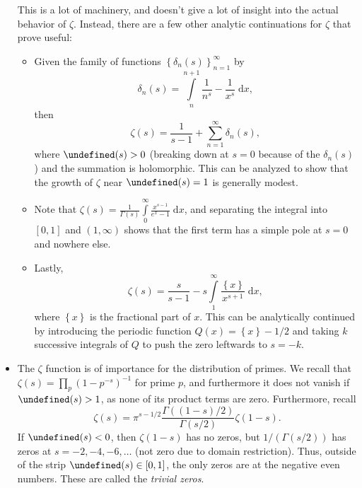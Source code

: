 \documentclass[11pt,
        usenames, %
        dvipsnames %
    ]{report}
\newcommand*{\p}[1]{\left(#1\right)}
\newcommand*{\z}[1]{\left\{#1\right\}}
\let\Re\undefined
\DeclareMathOperator{\Re}{Re}
\begin{document}
\begin{itemize}
        This is a lot of machinery, and doesn't give a lot of insight into the
        actual behavior of $\zeta$. Instead, there are a few other analytic
        continuations for $\zeta$ that prove useful:
        \begin{itemize}
            \item Given the family of functions $\z{\delta_n(s)}_{n =
                1}^\infty$ by
                \begin{equation}
                    \delta_n(s) = \int\limits_{n}^{n + 1}
                        \frac{1}{n^s} - \frac{1}{x^s}\;\mathrm{d}x,
                \end{equation}
                then
                \begin{equation}
                    \zeta(s) = \frac{1}{s - 1} + \sum\limits_{n = 1}^\infty
                        \delta_n(s),
                \end{equation}
                where $\Re(s) > 0$ (breaking down at $s = 0$ because of the
                $\delta_n(s)$) and the summation is holomorphic. This can be
                analyzed to show that the growth of $\zeta$ near $\Re(s) = 1$ is
                generally modest.

            \item Note that $\zeta(s) = \frac{1}{\Gamma(s)}\int\limits_0^\infty
                \frac{x^{s - 1}}{e^x - 1}\;\mathrm{d}x$, and separating the
                integral into $[0, 1]$ and $(1,\infty)$ shows that the first
                term has a simple pole at $s = 0$ and nowhere else.

            \item Lastly,
                \begin{equation}
                    \zeta(s) = \frac{s}{s - 1} - s\int\limits_1^\infty
                        \frac{\z{x}}{x^{s + 1}}\;\mathrm{d}x,
                \end{equation}
                where $\z{x}$ is the fractional part of $x$. This can be
                analytically continued by introducing the periodic function
                $Q(x) = \z{x} - 1/2$ and taking $k$ successive integrals of $Q$
                to push the zero leftwards to $s = -k$.
        \end{itemize}

    \item The $\zeta$ function is of importance for the distribution of primes.
        We recall that $\zeta(s) = \prod_p \p{1 - p^{-s}}^{-1}$ for prime $p$,
        and furthermore it does not vanish if $\Re(s) > 1$, as none of its
        product terms are zero. Furthermore, recall
        \begin{equation}
            \zeta(s) = \pi^{s- 1/2}\frac{\Gamma\p{(1 - s) / 2}}{\Gamma(s/2)}
                \zeta(1 - s).
        \end{equation}
        If $\Re(s) < 0$, then $\zeta(1 - s)$ has no zeros, but $1 / (\Gamma(s /
        2))$ has zeros at $s = -2, -4, -6,\dots$ (not zero due to domain
        restriction). Thus, outside of the strip $\Re(s) \in [0, 1]$, the only
        zeros are at the negative even numbers. These are called the
        \emph{trivial zeros}.


\end{itemize}
\end{document}
